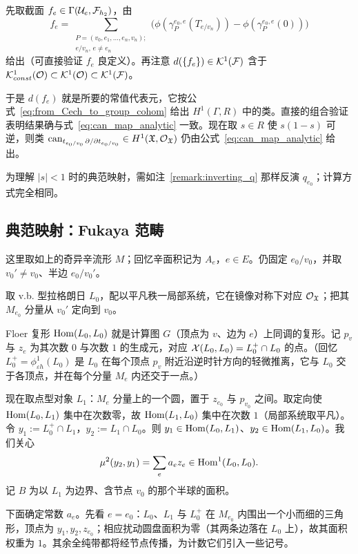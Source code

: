 先取截面 $f_{e}\in\Gamma(\mathcal{U}_{e},\mathcal{F}_{h_2})$，由
\[
f_{e}=\sum_{\substack{P=(v_0,e_1,\dots,e_n,v_n);\\ e/v_n,\,e\neq e_n}}\bigl(\phi(\gamma_P^{e_0,e}(T_{e/v_n}))-\phi(\gamma_P^{e_0,e}(0))\bigr)
\]
给出（可直接验证 $f_{e}$ 良定义）。再注意 $d(\{f_{e}\})\in \mathcal{K}^1(\mathcal{F})$ 含于 $\mathcal{K}^1_{const}(\mathcal{O})\subset\mathcal{K}^1(\mathcal{O})\subset \mathcal{K}^1(\mathcal{F})$。

于是 $d(f_{e})$ 就是所要的常值代表元，它按公式~\eqref{eq:from_Cech_to_group_cohom} 给出 $H^1(\Gamma,R)$ 中的类。直接的组合验证表明结果确与式~\eqref{eq:can_map_analytic} 一致。现在取 $s\in R$ 使 $s(1-s)$ 可逆，则类 $\operatorname{can}_{t_{e_0/v_0}\,\partial/\partial t_{e_0/v_0}}\in H^1(\mathfrak{X},\mathcal{O}_{\mathfrak{X}})$ 仍由公式~\eqref{eq:can_map_analytic} 给出。

\begin{remark}
为理解 $|s|<1$ 时的典范映射，需如注~\ref{remark:inverting_q} 那样反演 $q_{e_0}$；计算方式完全相同。
\end{remark}

\subsection{典范映射：Fukaya 范畴}\label{ss:canfukaya}

这里取如上的奇异辛流形 $M$；回忆辛面积记为 $A_{e}$，$e\in E$。仍固定 $e_0/v_0$，并取 $v_0'\neq v_0$、半边 $e_0/v_0'$。

取 v.b. 型拉格朗日 $L_0$，配以平凡秩一局部系统，它在镜像对称下对应 $\mathcal{O}_{\mathfrak{X}}$；把其 $M_{e_0}$ 分量从 $v_0'$ 定向到 $v_0$。

Floer 复形 $\operatorname{Hom}(L_0,L_0)$ 就是计算图 $G$（顶点为 $v$、边为 $e$）上同调的复形。记 $p_{v}$ 与 $z_{e}$ 为其次数 $0$ 与次数 $1$ 的生成元，对应 $\mathcal{X}(L_0,L_0)=L_0^+\cap L_0$ 的点。（回忆 $L_0^+=\phi^1_{\varepsilon h}(L_0)$ 是 $L_0$ 在每个顶点 $p_v$ 附近沿逆时针方向的轻微推离，它与 $L_0$ 交于各顶点，并在每个分量 $M_e$ 内还交于一点。）

现在取点型对象 $L_1$：$M_e$ 分量上的一个圆，置于 $z_{e_0}$ 与 $p_{v_0}$ 之间。取定向使 $\operatorname{Hom}(L_0,L_1)$ 集中在次数零，故 $\operatorname{Hom}(L_1,L_0)$ 集中在次数 $1$（局部系统取平凡）。令 $y_1:=L_0^+\cap L_1$，$y_2:=L_1\cap L_0$。则 $y_1\in\operatorname{Hom}(L_0,L_1)$、$y_2\in\operatorname{Hom}(L_1,L_0)$。我们关心
\[
\mu^2(y_2,y_1)=\sum_{e}a_{e}z_{e}\in\operatorname{Hom}^1(L_0,L_0).
\]
记 $B$ 为以 $L_1$ 为边界、含节点 $v_0$ 的那个半球的面积。

下面确定常数 $a_{e}$。先看 $e=e_0$：$L_0$、$L_1$ 与 $L_0^+$ 在 $M_{e_0}$ 内围出一个小而细的三角形，顶点为 $y_1,y_2,z_{e_0}$；相应扰动圆盘面积为零（其两条边落在 $L_0$ 上），故其面积权重为 $1$。其余全纯带都将经节点传播，为计数它们引入一些记号。

